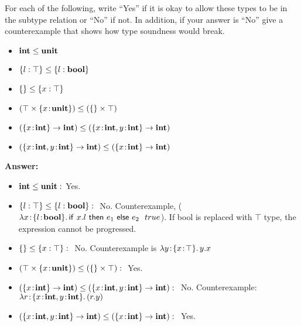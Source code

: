\documentclass[10pt]{article}
\begin{document}
\begin{exercise}
  For each of the following, write ``Yes'' if it is okay to allow
  these types to be in the subtype relation or ``No'' if not. In
  addition, if your answer is ``No'' give a counterexample that shows
  how type soundness would break.
\begin{itemize}
\item $\typ{int} \subty \typ{unit}$
\item $\{ l : \top \} \subty \{ l : \typ{bool} \}$
\item $\{ \} \subty \{ x : \top \}$ 
\item $(\top \times \{ x \ty \typ{unit} \}) \subty (\{\} \times \top)$
\item $(\{ x \ty \typ{int} \} \arrow \typ{int}) \subty (\{ x \ty \typ{int}, y \ty \typ{int} \} \arrow \typ{int})$
\item $(\{ x \ty \typ{int}, y \ty \typ{int} \} \arrow \typ{int}) \subty (\{ x \ty \typ{int} \} \arrow \typ{int})$
\end{itemize}
\noindent \textbf{Answer:}
\begin{itemize}
\item $\typ{int} \subty \typ{unit}:$ Yes.
\item $\{ l : \top \} \subty \{ l : \typ{bool} \}: \ $ No. Counterexample, ($\lam{x\ty \{l\ty\typ{bool}\}}{\cond[\lamfnt]{x.l}{e_1}{e_2}} \ \ true$). If bool is replaced with $\top$ type, the expression cannot be progressed.
\item $\{ \} \subty \{ x : \top \}: \ $ No. Counterexample is $\lam{y\ty\{x\ty\top\}}{y.x}$
\item $(\top \times \{ x \ty \typ{unit} \}) \subty (\{\} \times \top): \ $ Yes.
\item $(\{ x \ty \typ{int} \} \arrow \typ{int}) \subty (\{ x \ty \typ{int}, y \ty \typ{int} \} \arrow \typ{int}): \ $ No. Counterexample: $\lam{r\ty \{ x \ty \typ{int}, y \ty \typ{int} \}}{(r.y)}$
\item $(\{ x \ty \typ{int}, y \ty \typ{int} \} \arrow \typ{int}) \subty (\{ x \ty \typ{int} \} \arrow \typ{int}): \ $ Yes.
\end{itemize}
\end{exercise}
\end{document}
